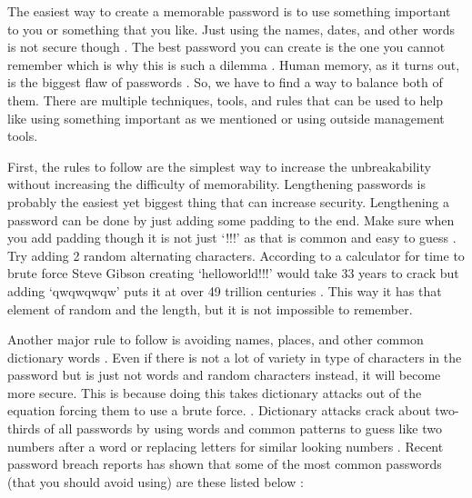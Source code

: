\documentclass[acmsmall,nonacm]{acmart}
\begin{document}
The easiest way to create a memorable password is to use something important to you or something that you like. Just using the names, dates, and other words is not secure though \cite{rubenking_2021}. The best password you can create is the one you cannot remember which is why this is such a dilemma \cite{lee_2014}. Human memory, as it turns out, is the biggest flaw of passwords \cite{yan_2000}. So, we have to find a way to balance both of them. There are multiple techniques, tools, and rules that can be used to help like using something important as we mentioned or using outside management tools.

First, the rules to follow are the simplest way to increase the unbreakability without increasing the difficulty of memorability. Lengthening passwords is probably the easiest yet biggest thing that can increase security. Lengthening a password can be done by just adding some padding to the end. Make sure when you add padding though it is not just ‘!!!’ as that is common and easy to guess \cite{rubenking_2021}. Try adding 2 random alternating characters. According to a calculator for time to brute force Steve Gibson creating ‘helloworld!!!’ would take 33 years to crack but adding ‘qwqwqwqw’ puts it at over 49 trillion centuries \cite{rubenking_2021}. This way it has that element of random and the length, but it is not impossible to remember.

Another major rule to follow is avoiding names, places, and other common dictionary words \cite{lee_2014}. Even if there is not a lot of variety in type of characters in the password but is just not words and random characters instead, it will become more secure. This is because doing this takes dictionary attacks out of the equation forcing them to use a brute force. \cite{rubenking_2021}. Dictionary attacks crack about two-thirds of all passwords by using words and common patterns to guess like two numbers after a word or replacing letters for similar looking numbers \cite{lee_2014}. Recent password breach reports has shown that some of the most common passwords (that you should avoid using) are these listed below \cite{nordpass}:
\end{document}
